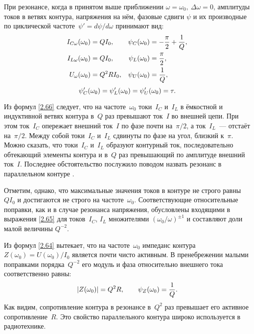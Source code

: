 При резонансе, когда в принятом выше приближении
$\omega=\omega_0,~\Delta\omega=0$, амплитуды токов в ветвях контура, напряжения
на нём, фазовые сдвиги $\psi$ и их производные по циклической частоте~$\psi'=d\psi/d\omega$
принимают вид:
\begin{equation}
\eqmark{2.66}
\begin{aligned}
I_{C\omega}(\omega_0)& =QI_0, &
    \psi_C(\omega_0) & =-\dfrac{\pi}{2}+\frac1Q,\\
I_{L\omega}(\omega_0)&= QI_0, &
        \psi_L(\omega_0)&=\dfrac{\pi}{2},\\
U_{\omega}(\omega_0)&=Q^2RI_0, &
\psi_U(\omega_0)&=\frac1Q,
\end{aligned}
\end{equation}
\begin{equation*}
			\eqmark{2.66c}
			\psi'_C(\omega_0)=\psi'_L(\omega_0)=\psi'_U(\omega_0)=\tau.
\end{equation*}

Из формул \eqref{2.66} следует, что на частоте~$\omega_0$ 
токи~$I_C$ и~$I_L$ в ёмкостной и индуктивной ветвях контура 
в~$Q$ раз превышают ток~$I$ во внешней цепи. 
При этом ток~$I_C$ опережает внешний ток~$I$ по фазе почти на~$\pi/2$, а
ток~$I_L$~--- отстаёт на~$\pi/2$. Между собой токи~$I_C$ и~$I_L$ сдвинуты по
фазе на угол, близкий к~$\pi$. Можно сказать, что токи~$I_C$ и~$I_L$ образуют
контурный ток, последовательно обтекающий элементы контура и в~$Q$ раз
превышающий по амплитуде внешний ток~$I$. Последнее обстоятельство послужило
поводом назвать резонанс в параллельном контуре .

Отметим, однако, что максимальные значения токов в контуре не строго равны
$QI_0$ и достигаются не строго на частоте~$\omega_0$. Соответствующие
относительные поправки, как и в случае резонанса напряжения, обусловлены
входящими в выражения \eqref{2.65} для токов~$I_C$, $I_L$
множителями $(\omega_0/\omega)^{\pm1}$ и составляют доли малой величины
$Q^{-2}$.

Из формул \eqref{2.64} вытекает, что на частоте~$\omega_0$ импеданс контура
$Z(\omega_0)=U(\omega_0)/I_0$ является почти чисто активным. В
пренебрежении малыми поправками порядка~$Q^{-2}$ его модуль и фаза
относительно внешнего тока соответственно равны:
\begin{equation}\eqmark{2.67}
|Z(\omega_0)|=Q^2R,
\qquad \psi_Z(\omega_0)=\frac1Q.
\end{equation}
Как видим, сопротивление контура в резонансе в~$Q^2$ раз превышает его активное
сопротивление~$R$. Это свойство параллельного контура широко используется в
радиотехнике.

